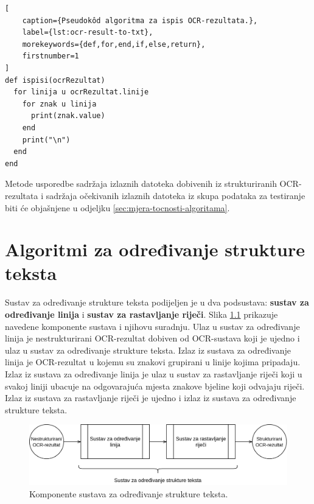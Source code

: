 \documentclass[times, utf8, zavrsni]{fer}
\begin{document}
\begin{lstlisting}[
    caption={Pseudokôd algoritma za ispis OCR-rezultata.},
    label={lst:ocr-result-to-txt},
    morekeywords={def,for,end,if,else,return},
    firstnumber=1
]
def ispisi(ocrRezultat)
  for linija u ocrRezultat.linije
    for znak u linija
      print(znak.value)
    end
    print("\n")
  end
end
\end{lstlisting}

Metode usporedbe sadržaja izlaznih datoteka dobivenih iz strukturiranih
OCR-rezultata i sadržaja očekivanih izlaznih datoteka iz skupa podataka za
testiranje biti će objašnjene u odjeljku
\ref{sec:mjera-tocnosti-algoritama}.
















\chapter{Algoritmi za određivanje strukture teksta}
\label{chap:algoritmi-za-odredivanje-strukture-teksta}
Sustav za određivanje strukture teksta podijeljen je u dva podsustava:
\textbf{sustav za određivanje linija} i \textbf{sustav za rastavljanje riječi}.
Slika \ref{fig:sustav-03} prikazuje navedene komponente sustava i njihovu
suradnju. Ulaz u sustav za određivanje linija je nestrukturirani OCR-rezultat
dobiven od OCR-sustava koji je ujedno i ulaz u sustav za određivanje strukture
teksta. Izlaz iz sustava za određivanje linija je OCR-rezultat
u kojemu su znakovi grupirani u linije kojima pripadaju. Izlaz
iz sustava za određivanje linija je ulaz u sustav za rastavljanje riječi koji
u svakoj liniji ubacuje na odgovarajuća mjesta znakove bjeline koji odvajaju
riječi. Izlaz iz sustava za rastavljanje riječi je ujedno i izlaz iz sustava
za određivanje strukture teksta.
\begin{figure}[htb]
    \centering
    \captionsetup{justification=centering,margin=2cm}
    \includegraphics[width=\textwidth]{images/sustav-03.png}
    \caption{
        Komponente sustava za određivanje strukture teksta.
    }
    \label{fig:sustav-03}
\end{figure}
\end{document}
